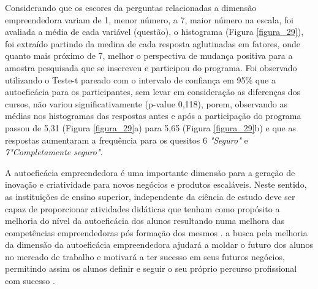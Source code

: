 Considerando que os escores da perguntas relacionadas a dimensão empreendedora variam de
1, menor número, a 7, maior número na escala,
foi avaliada a média de cada variável (questão),
o histograma (Figura \ref{figura_29}), foi extraído partindo da medina de cada resposta aglutinadas em fatores, onde quanto mais próximo de 7, melhor o perspectiva de mudança positiva para a amostra pesquisada que se inscreveu e participou do programa. Foi observado utilizando o Teste-t pareado com o intervalo de confiança em 95\%  que a autoeficácia para os participantes, sem levar em consideração as diferenças dos cursos, não variou significativamente (p-value 0,118), porem, observando as médias nos histogramas das respostas antes e após a participação do programa passou de 5,31 (Figura \ref{figura_29}a) para 5,65 (Figura \ref{figura_29}b) e que as respostas aumentaram a frequência para os quesitos 6 \textit{"Seguro"} e \textit{7"Completamente seguro"}.

A autoeficácia empreendedora é uma importante dimensão para a geração de inovação e criatividade para novos negócios e produtos escaláveis. Neste sentido, as instituições de ensino superior, independente da ciência de estudo deve ser capaz de proporcionar atividades didáticas que tenham como propósito a melhoria do nível da autoeficácia dos alunos resultando numa melhora das competências empreendedoras  pós formação dos mesmos \cite{ribeiro_autoeficacia_2019}. a busca pela melhoria da dimensão da autoeficácia empreendedora ajudará a moldar o futuro dos alunos no mercado de trabalho e motivará a ter sucesso em seus futuros negócios, permitindo assim os alunos  definir e seguir o seu próprio percurso profissional com sucesso  \cite{das_examining_2018}.

